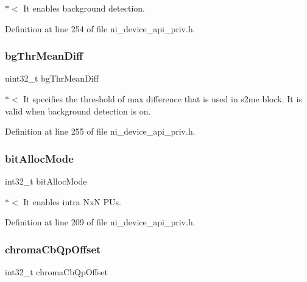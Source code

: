 $\ast$$<$ It enables background detection. 

Definition at line 254 of file ni\+\_\+device\+\_\+api\+\_\+priv.\+h.

\mbox{\label{struct__ni__t408__config__t_a823c4e808a39c1e81364083086bf3be7}} 
\subsubsection{\texorpdfstring{bgThrMeanDiff}{bgThrMeanDiff}}
{\footnotesize\ttfamily uint32\+\_\+t bg\+Thr\+Mean\+Diff}

$\ast$$<$ It specifies the threshold of max difference that is used in s2me block. It is valid when background detection is on. 

Definition at line 255 of file ni\+\_\+device\+\_\+api\+\_\+priv.\+h.

\mbox{\label{struct__ni__t408__config__t_a6346a66e3a3e2a1b68f8c6fd8e9e4ef3}} 
\subsubsection{\texorpdfstring{bitAllocMode}{bitAllocMode}}
{\footnotesize\ttfamily int32\+\_\+t bit\+Alloc\+Mode}

$\ast$$<$ It enables intra NxN P\+Us. 

Definition at line 209 of file ni\+\_\+device\+\_\+api\+\_\+priv.\+h.

\mbox{\label{struct__ni__t408__config__t_ad0a3befd3ed0ebb0c7003acaa5492922}} 
\subsubsection{\texorpdfstring{chromaCbQpOffset}{chromaCbQpOffset}}
{\footnotesize\ttfamily int32\+\_\+t chroma\+Cb\+Qp\+Offset}

